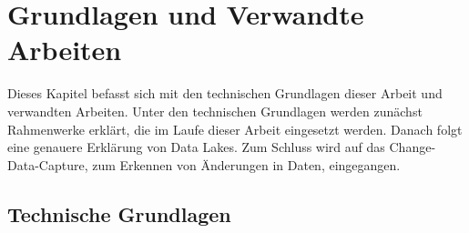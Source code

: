 \chapter{Grundlagen und Verwandte Arbeiten}

Dieses Kapitel befasst sich mit den technischen Grundlagen dieser Arbeit und verwandten Arbeiten.
Unter den technischen Grundlagen werden zunächst Rahmenwerke erklärt, die im Laufe dieser Arbeit eingesetzt werden.
Danach folgt eine genauere Erklärung von Data Lakes.
Zum Schluss wird auf das Change-Data-Capture, zum Erkennen von Änderungen in Daten, eingegangen.

\section{Technische Grundlagen}



\pagebreak


